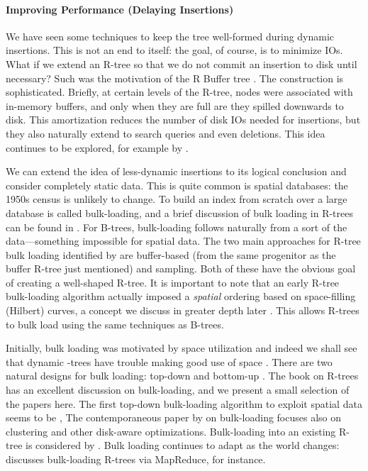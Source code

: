 \paragraph{Improving Performance (Delaying Insertions)}
We have seen some techniques to keep the tree well-formed during dynamic insertions.
This is not an end to itself: the goal, of course, is to minimize IOs.
What if we extend an R-tree so that we do not commit an insertion to disk until necessary?
Such was the motivation of the R Buffer tree \cite{argehinrichsvahrenholdvitter99}.
The construction is sophisticated.
Briefly, at certain levels of the R-tree, nodes were associated with in-memory buffers, and only when they are full are they spilled downwards to disk.
This amortization reduces the number of disk IOs needed for insertions, but they also naturally extend to search queries and even deletions.
This idea continues to be explored, for example by \cite{biveinissaltenisjensen07}.

We can extend the idea of less-dynamic insertions to its logical conclusion and consider completely static data.
This is quite common is spatial databases: the 1950s census is unlikely to change.
To build an index from scratch over a large database is called bulk-loading, and a brief discussion of bulk loading in R-trees can be found in \cite{berckenseeger01}.
For B-trees, bulk-loading follows naturally from a sort of the data---something impossible for spatial data.
The two main approaches for R-tree bulk loading identified by \cite{berckenseeger01} are buffer-based (from the same progenitor as the buffer R-tree just mentioned) and sampling.
Both of these have the obvious goal of creating a well-shaped R-tree.
It is important to note that an early R-tree bulk-loading algorithm actually imposed a \emph{spatial} ordering based on space-filling (Hilbert) curves, a concept we discuss in greater depth later \cite{kamelfaloutsos94}.
This allows R-trees to bulk load using the same techniques as B-trees.

Initially, bulk loading was motivated by space utilization \cite{garcialopezleutenegger98,kamelfaloutsos94} and indeed we shall see that dynamic \rbase-trees have trouble making good use of space \cite{huanglinlin01}.
There are two natural designs for bulk loading: top-down and bottom-up \cite{thebook}.
The book on R-trees \cite{thebook} has an excellent discussion on bulk-loading, and we present a small selection of the papers here.
The first top-down bulk-loading algorithm to exploit spatial data seems to be \cite{garcialopezleutenegger98},
The contemporaneous paper by \cite{berchtoldbohmkriegel98} on bulk-loading focuses also on clustering and other disk-aware optimizations.
Bulk-loading into an existing R-tree is considered by \cite{chenchoubeyrundensteiner98}.
Bulk loading continues to adapt as the world changes: \cite{tanluomaoni12} discusses bulk-loading R-trees via MapReduce, for instance.


